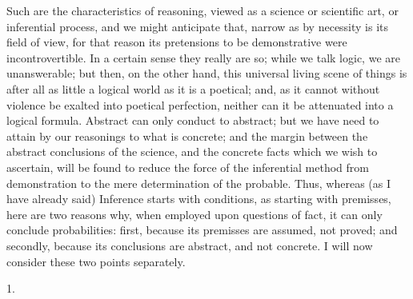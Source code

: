 Such are the characteristics of reasoning, viewed as a science or
scientific art, or inferential process, and we might anticipate that,
narrow as by necessity is its field of view, for that reason its
pretensions to be demonstrative were incontrovertible. In a certain
sense they really are so; while we talk logic, we are unanswerable;
but then, on the other hand, this universal living scene of things is
after all as little a logical world as it is a poetical; and, as it
cannot without violence be exalted into poetical perfection, neither
can it be attenuated into a logical formula. Abstract can only conduct
to abstract; but we have need to attain by our reasonings to what is
concrete; and the margin between the abstract conclusions of the
science, and the concrete facts which we wish to ascertain, will be
found to reduce the force of the inferential method from demonstration
to the mere determination of the probable. Thus, whereas (as I have
already said) Inference starts with conditions, as starting with
premisses, here are two reasons why, when employed upon questions of
fact, it can only conclude probabilities: first, because its premisses
are assumed, not proved; and secondly, because its conclusions are abstract, and not concrete. I will now consider these two points
separately.

1.

